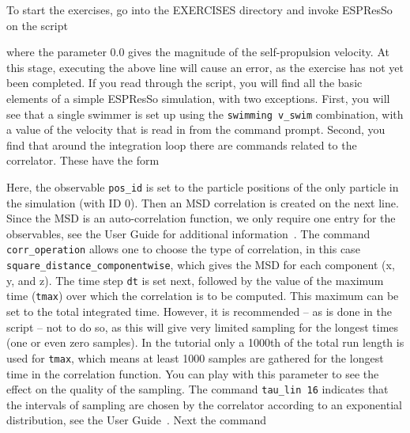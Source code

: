 \documentclass[aip,jcp,reprint,a4paper,onecolumn,amsmath]{revtex4-1}
\newcommand{\es}{\mbox{\textsf{ESPResSo}}\xspace}
\newcommand\codees{\lstinline[language=espresso]}
\begin{document}
To start the exercises, go into the EXERCISES directory and invoke \es{} on the script
where the parameter 0.0 gives the magnitude of the self-propulsion velocity. At this stage, executing the above line will cause an error, as the exercise has not yet been completed. If you read through the script, you will find all the basic elements of a simple \es{} simulation, with two exceptions. First, you will see that a single swimmer is set up using the \codees{swimming v_swim} combination, with a value of the velocity that is read in from the command prompt. Second, you find that around the integration loop there are commands related to the correlator. These have the form
Here, the observable \codees{pos_id} is set to the particle positions of the only particle in the simulation (with ID 0). Then an MSD correlation is created on the next line. Since the MSD is an auto-correlation function, we only require one entry for the observables, see the User Guide for additional information~\cite{UG}. The command \codees{corr_operation} allows one to choose the type of correlation, in this case \codees{square_distance_componentwise}, which gives the MSD for each component (x, y, and z). The time step \codees{dt} is set next, followed by the value of the maximum time (\codees{tmax}) over which the correlation is to be computed. This maximum can be set to the total integrated time. However, it is recommended -- as is done in the script -- not to do so, as this will give very limited sampling for the longest times (one or even zero samples). In the tutorial only a 1000th of the total run length is used for \codees{tmax}, which means at least 1000 samples are gathered for the longest time in the correlation function. You can play with this parameter to see the effect on the quality of the sampling. The command \codees{tau_lin 16} indicates that the intervals of sampling are chosen by the correlator according to an exponential distribution, see the User Guide~\cite{UG}. Next the command 
\end{document}
